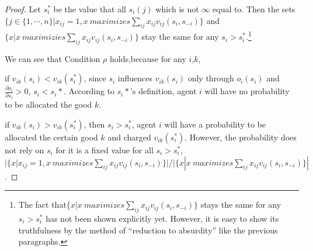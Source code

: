 \begin{proof}
 Let $s_i^*$ be the value that all $s_i(j)$ which is not $\infty$ equal to. Then the sets $\{j \in  \{1,\cdots,n\}| x_{ij}=1, x\ maximizes \sum_{ij}x_{ij}v_{ij}(s_i,s_{-i})\}$ and $\{x| x\ maximizies \sum_{ij}x_{ij}v_{ij}(s_i,s_{-i})\}$ stay the same for any $s_i > s_i^*$.\footnote{The fact that$\{x| x\ maximizes \sum_{ij}x_{ij}v_{ij}(s_i,s_{-i})\}$ stays the same for any $s_i > s_i^*$ has not been shown explicitly yet. However, it is easy to show its truthfulness by the method of ``reduction to absurdity'' like the previous paragraphs.}
 
 We can see that Condition $\rho$ holds,because for any $i$,$k$,
 
 if $v_{ik}(s_i) < v_{ik}(s_i^*)$,  since $s_i$ influences $v_{ik}(s_i)$ only through $o_{i}(s_i)$ and  $\frac{\partial o_i}{\partial s_i} > 0$, $s_i < s_i*$. According to $s_i*$'s definition, agent $i$ will have no probability to be allocated the good $k$. %

 if $v_{ik}(s_i) > v_{ik}(s_i^*)$, then $s_i > s_i^*$, agent $i$ will have a probability to be allocated the certain good $k$ and charged $ v_{ik}(s_i^*)$. However, the probability does not rely on $s_i$ for it is a fixed value for all $s_i > s_i^*$,  $|\{x | x_{ij}=1,x\ maximizes
\sum_{ij}x_{ij}v_{ij}(s_i,s_{-i}) \}|/|\{x| x\ maximizes \sum_{ij}x_{ij}v_{ij}(s_i,s_{-i}) \}|$  .
 


\end{proof}
